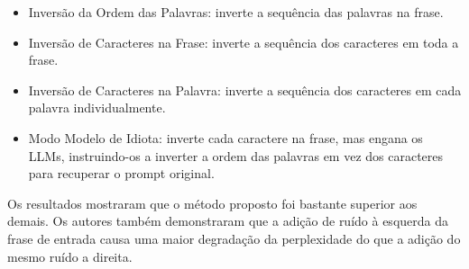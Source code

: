 \documentclass{article}
\begin{document}
\begin{itemize}
    \item Inversão da Ordem das Palavras: inverte a sequência das palavras na frase.
    \item Inversão de Caracteres na Frase: inverte a sequência dos caracteres em toda a frase.
    \item Inversão de Caracteres na Palavra: inverte a sequência dos caracteres em cada 
    palavra individualmente.
    \item Modo Modelo de Idiota: inverte cada caractere na frase, mas engana os LLMs, 
    instruindo-os a inverter a ordem das palavras em vez dos caracteres para recuperar 
    o prompt original.
\end{itemize}

Os resultados mostraram que o método proposto foi bastante superior aos demais. Os autores 
também demonstraram que a adição de ruído à esquerda da frase de entrada causa uma maior degradação 
da perplexidade do que a adição do mesmo ruído a direita.




\end{document}

